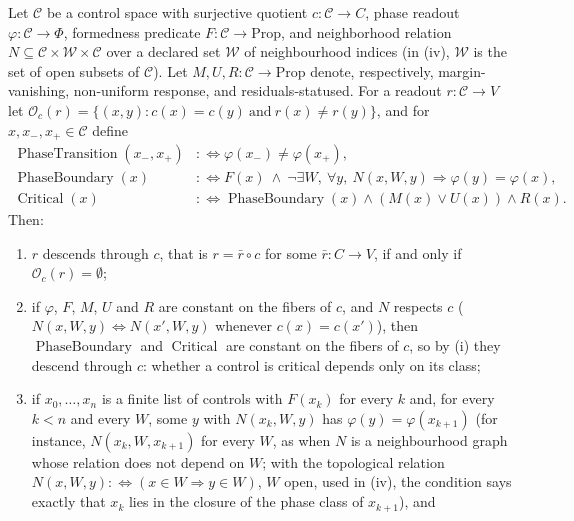 \begin{theorem}\label{thm:F44}
Let \(\mathcal C\) be a control space with surjective quotient
\(c:\mathcal C\to C\), phase readout \(\varphi:\mathcal C\to\Phi\),
formedness predicate \(F:\mathcal C\to\mathrm{Prop}\), and
neighborhood relation \(N\subseteq\mathcal C\times\mathcal W\times\mathcal C\) over a
declared set \(\mathcal W\) of neighbourhood indices (in (iv), \(\mathcal W\) is
the set of open subsets of \(\mathcal C\)). Let
\(M,U,R:\mathcal C\to\mathrm{Prop}\) denote, respectively,
margin-vanishing, non-uniform response, and
residuals-statused. For a readout \(r:\mathcal C\to V\) let
\(\mathcal O_c(r)=\{(x,y):c(x)=c(y)\ \text{and}\ r(x)\ne r(y)\}\), and for
\(x,x_-,x_+\in\mathcal C\) define
\begin{align*}
  \operatorname{PhaseTransition}(x_-,x_+)
  &:\Longleftrightarrow \varphi(x_-)\ne\varphi(x_+),\\
  \operatorname{PhaseBoundary}(x)
  &:\Longleftrightarrow F(x)\ \wedge\
    \neg\exists W,\ \forall y,\ N(x,W,y)\Rightarrow \varphi(y)=\varphi(x),\\
  \operatorname{Critical}(x)
  &:\Longleftrightarrow \operatorname{PhaseBoundary}(x)\wedge (M(x)\vee U(x))\wedge R(x).
\end{align*}
Then:
\begin{enumerate}[label=(\roman*)]
\item \(r\) descends through \(c\), that is \(r=\bar r\circ c\) for some
  \(\bar r:C\to V\), if and only if \(\mathcal O_c(r)=\emptyset\);
\item if \(\varphi\), \(F\), \(M\), \(U\) and \(R\) are constant on the fibers
  of \(c\), and \(N\) respects \(c\) (\(N(x,W,y)\iff N(x',W,y)\) whenever
  \(c(x)=c(x')\)), then \(\operatorname{PhaseBoundary}\) and
  \(\operatorname{Critical}\) are constant on the fibers of \(c\), so by (i)
  they descend through \(c\): whether a control is critical depends only on
  its class;
\item if \(x_0,\dots,x_n\) is a finite list of controls with \(F(x_k)\) for
  every \(k\) and, for every \(k<n\) and every \(W\), some \(y\) with
  \(N(x_k,W,y)\) has \(\varphi(y)=\varphi(x_{k+1})\) (for instance,
  \(N(x_k,W,x_{k+1})\) for every \(W\), as when \(N\) is a neighbourhood graph
  whose relation does not depend on \(W\); with the topological relation \(N(x,W,y):\Leftrightarrow(x\in W\Rightarrow y\in W)\), \(W\) open, used in (iv), the condition says exactly that \(x_k\) lies in the closure of the phase class of \(x_{k+1}\)), and

\end{enumerate}
\end{theorem}
